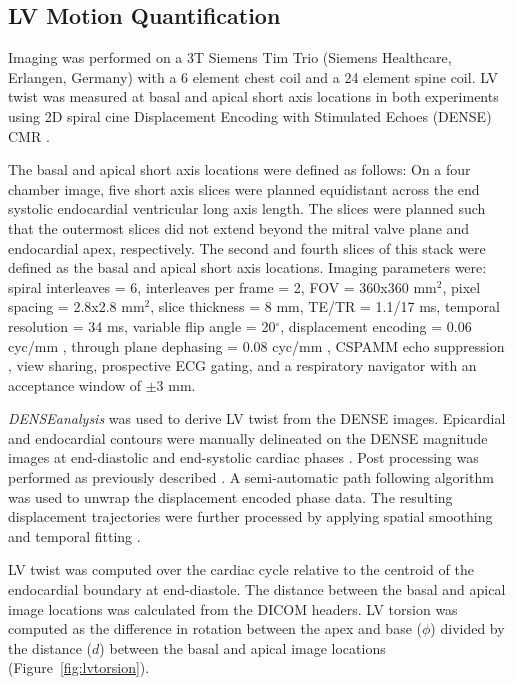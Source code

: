 \subsection{LV Motion Quantification}
	Imaging was performed on a 3T Siemens Tim Trio (Siemens Healthcare, Erlangen, Germany) with a 6 element chest coil and a 24 element spine coil. LV twist was measured at basal and apical short axis locations in both experiments using 2D spiral cine Displacement Encoding with Stimulated Echoes (DENSE) CMR \cite{Zhong2010a,Wehner2015}.
	
	The basal and apical short axis locations were defined as follows: On a four chamber image, five short axis slices were planned equidistant across the end systolic endocardial ventricular long axis length. The slices were planned such that the outermost slices did not extend beyond the mitral valve plane and endocardial apex, respectively. The second and fourth slices of this stack were defined as the basal and apical short axis locations. Imaging parameters were: spiral interleaves = 6, interleaves per frame = 2, FOV = 360x360 mm$^2$, pixel spacing = 2.8x2.8 mm$^2$, slice thickness = 8 mm, TE/TR = 1.1/17 ms, temporal resolution = 34 ms, variable flip angle = 20$^{\circ}$, displacement encoding = 0.06 cyc/mm \cite{Wehner2015a}, through plane dephasing = 0.08 cyc/mm \cite{Zhong2006a}, CSPAMM echo suppression \cite{Kim2004}, view sharing, prospective ECG gating, and a respiratory navigator with an acceptance window of $\pm$3 mm.
	
	\textit{DENSEanalysis} \cite{Gilliam2016a} was used to derive LV twist from the DENSE images. Epicardial and endocardial contours were manually delineated on the DENSE magnitude images at end-diastolic and end-systolic cardiac phases \cite{Suever2014}. Post processing was performed as previously described \cite{Suever2014}. A semi-automatic path following algorithm was used to unwrap the displacement encoded phase data. The resulting displacement trajectories were further processed by applying spatial smoothing and temporal fitting \cite{Spottiswoode2007}.
	
	LV twist was computed over the cardiac cycle relative to the centroid of the endocardial boundary at end-diastole. The distance between the basal and apical image locations was calculated from the DICOM headers. LV torsion was computed as the difference in rotation between the apex and base ($\phi$) divided by the distance ($d$) between the basal and apical image locations \cite{Donekal2013a,Phan2009a,Sorger2003a} (Figure~\ref{fig:lvtorsion}).

